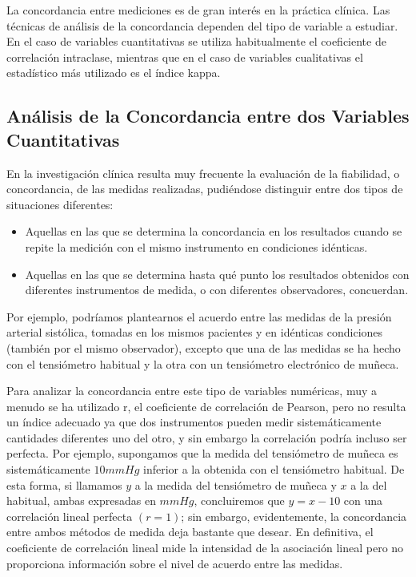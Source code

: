 La concordancia entre mediciones es de gran interés en la práctica clínica. Las técnicas de análisis de la concordancia
dependen del tipo de variable a estudiar. En el caso de variables cuantitativas se utiliza habitualmente el coeficiente
de correlación intraclase, mientras que en el caso de variables cualitativas el estadístico más utilizado es el índice
kappa.

\subsection{Análisis de la Concordancia entre dos Variables Cuantitativas}
En la investigación clínica resulta muy frecuente la evaluación de la fiabilidad, o concordancia, de las medidas
realizadas, pudiéndose distinguir entre dos tipos de situaciones diferentes:
\begin{itemize}
\item Aquellas en las que se determina la concordancia en los resultados cuando se repite la medición con el mismo
instrumento en condiciones idénticas.
\item Aquellas en las que se determina hasta qué punto los resultados obtenidos con diferentes instrumentos de medida, o
con diferentes observadores, concuerdan.
\end{itemize}
 
Por ejemplo, podríamos plantearnos el acuerdo entre las medidas de la presión arterial sistólica, tomadas en los
mismos pacientes y en idénticas condiciones (también por el mismo observador), excepto que una de las medidas se ha
hecho con el tensiómetro habitual y la otra con un tensiómetro electrónico de muñeca.

Para analizar la concordancia entre este tipo de variables numéricas, muy a menudo se ha utilizado r, el coeficiente de
correlación de Pearson, pero no resulta un índice adecuado ya que dos instrumentos pueden medir sistemáticamente
cantidades diferentes uno del otro, y sin embargo la correlación podría incluso ser perfecta. Por ejemplo, supongamos
que la medida del tensiómetro de muñeca es sistemáticamente $10 mmHg$ inferior a la obtenida con el tensiómetro
habitual. De esta forma, si llamamos $y$ a la medida del tensiómetro de muñeca y $x$ a la del habitual, ambas expresadas
en $mmHg$, concluiremos que $y=x-10$ con una correlación lineal perfecta $(r = 1)$; sin embargo, evidentemente, la
concordancia entre ambos métodos de medida deja bastante que desear. En definitiva, el coeficiente de correlación lineal
mide la intensidad de la asociación lineal pero no proporciona información sobre el nivel de acuerdo entre las medidas.

